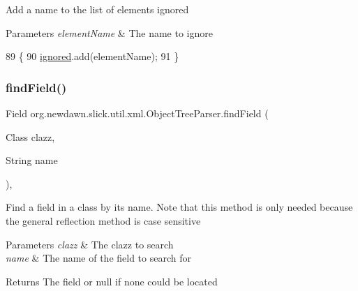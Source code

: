 Add a name to the list of elements ignored


\begin{DoxyParams}{Parameters}
{\em element\+Name} & The name to ignore \\
\hline
\end{DoxyParams}

\begin{DoxyCode}
89                                                       \{
90         \mbox{\hyperlink{classorg_1_1newdawn_1_1slick_1_1util_1_1xml_1_1_object_tree_parser_ac7fe7d041a44835a28a1f7effaf03410}{ignored}}.add(elementName);
91     \}
\end{DoxyCode}
\mbox{\label{classorg_1_1newdawn_1_1slick_1_1util_1_1xml_1_1_object_tree_parser_a8498dcdf85563156aa04fd5dbc6b3637}} 
\subsubsection{\texorpdfstring{find\+Field()}{findField()}}
{\footnotesize\ttfamily Field org.\+newdawn.\+slick.\+util.\+xml.\+Object\+Tree\+Parser.\+find\+Field (\begin{DoxyParamCaption}\item[{Class}]{clazz,  }\item[{String}]{name }\end{DoxyParamCaption})\hspace{0.3cm}{\ttfamily [inline]}, {\ttfamily [private]}}

Find a field in a class by it\textquotesingle{}s name. Note that this method is only needed because the general reflection method is case sensitive


\begin{DoxyParams}{Parameters}
{\em clazz} & The clazz to search \\
\hline
{\em name} & The name of the field to search for \\
\hline
\end{DoxyParams}
\begin{DoxyReturn}{Returns}
The field or null if none could be located 
\end{DoxyReturn}


